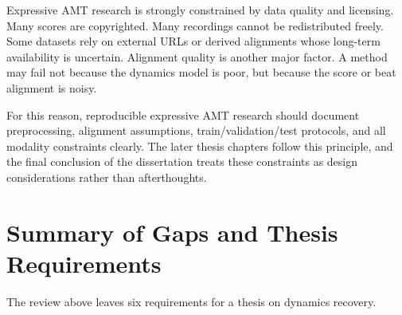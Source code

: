 Expressive AMT research is strongly constrained by data quality and licensing. Many scores are copyrighted. Many recordings cannot be redistributed freely. Some datasets rely on external URLs or derived alignments whose long-term availability is uncertain. Alignment quality is another major factor. A method may fail not because the dynamics model is poor, but because the score or beat alignment is noisy.

For this reason, reproducible expressive AMT research should document preprocessing, alignment assumptions, train/validation/test protocols, and all modality constraints clearly. The later thesis chapters follow this principle, and the final conclusion of the dissertation treats these constraints as design considerations rather than afterthoughts.

\section{Summary of Gaps and Thesis Requirements}
\label{sec:bg:summary}

The review above leaves six requirements for a thesis on dynamics recovery. 

